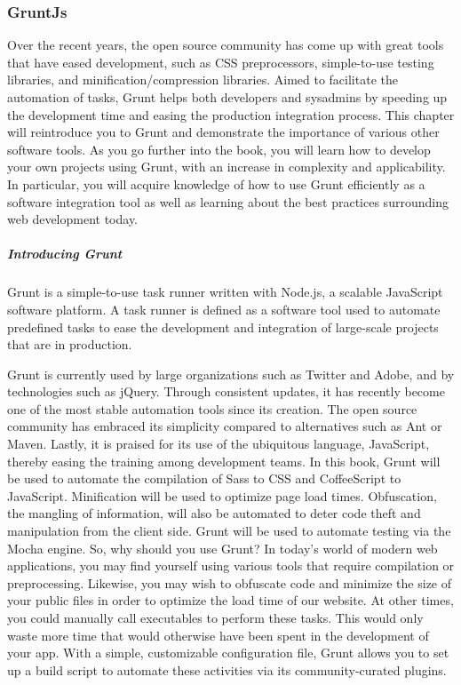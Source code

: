 \subsubsection{GruntJs}
Over the recent years, the open source community has come up with great tools that
have eased development, such as CSS preprocessors, simple-to-use testing libraries,
and minification/compression libraries. Aimed to facilitate the automation of tasks,
Grunt helps both developers and sysadmins by speeding up the development time
and easing the production integration process.
This chapter will reintroduce you to Grunt and demonstrate the importance
of various other software tools. As you go further into the book, you will learn
how to develop your own projects using Grunt, with an increase in complexity
and applicability. In particular, you will acquire knowledge of how to use Grunt
efficiently as a software integration tool as well as learning about the best practices
surrounding web development today.\cite{6}
\subparagraph*{Introducing Grunt}
\hfill \break
Grunt is a simple-to-use task runner written with Node.js, a scalable JavaScript
software platform. A task runner is defined as a software tool used to automate
predefined tasks to ease the development and integration of large-scale projects
that are in production.\cite{6}

Grunt is currently used by large organizations such as Twitter and Adobe, and by
technologies such as jQuery. Through consistent updates, it has recently become
one of the most stable automation tools since its creation. The open source
community has embraced its simplicity compared to alternatives such as Ant or
Maven. Lastly, it is praised for its use of the ubiquitous language, JavaScript, thereby
easing the training among development teams. In this book, Grunt will be used to
automate the compilation of Sass to CSS and CoffeeScript to JavaScript. Minification
will be used to optimize page load times. Obfuscation, the mangling of information,
will also be automated to deter code theft and manipulation from the client side.
Grunt will be used to automate testing via the Mocha engine.
So, why should you use Grunt? In today's world of modern web applications, you
may find yourself using various tools that require compilation or preprocessing.
Likewise, you may wish to obfuscate code and minimize the size of your public files
in order to optimize the load time of our website. At other times, you could manually
call executables to perform these tasks. This would only waste more time that
would otherwise have been spent in the development of your app. With a simple,
customizable configuration file, Grunt allows you to set up a build script to automate
these activities via its community-curated plugins.\cite{6}
